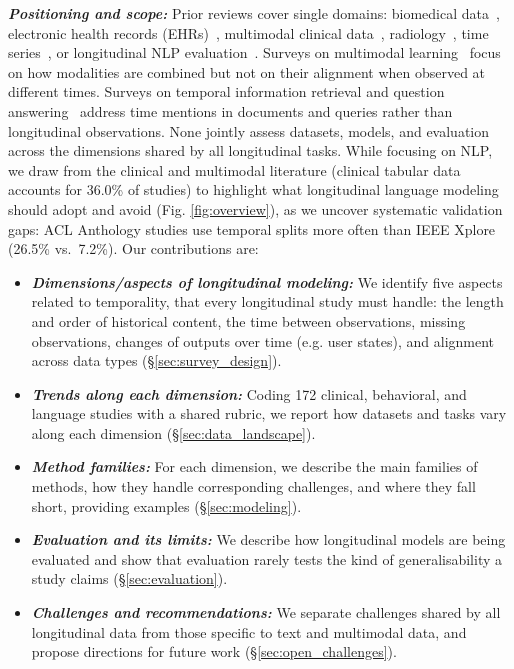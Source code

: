 \documentclass[11pt]{article}
\theoremstyle{plain}
\theoremstyle{definition}
\theoremstyle{remark}
\begin{document}
\noindent\emph{\textbf{Positioning and scope:}} Prior reviews cover single domains: biomedical data~\cite{cascarano2023machine}, electronic health records (EHRs)~\cite{xie2022deep,carrasco2023prediction}, multimodal clinical data~\cite{pan2026systematic}, radiology~\cite{zhou2025review}, time series~\cite{jin2026large}, or longitudinal NLP evaluation~\cite{ganesan2026word}. %
Surveys on multimodal learning~\cite{xu2024comprehensive} focus on how modalities are combined but not on their alignment when observed at different times. Surveys on temporal information retrieval and question answering~\cite{piryani2025itshightimesurvey} address time mentions in documents and queries rather than longitudinal observations. None jointly assess datasets, models, and evaluation across the dimensions shared by all longitudinal tasks. While focusing on NLP, we draw from the clinical and multimodal literature (clinical tabular data accounts for 36.0\% of studies) to highlight what longitudinal language modeling should adopt and avoid (Fig. \ref{fig:overview}), as we uncover systematic validation gaps: ACL Anthology studies use temporal splits more often than IEEE Xplore (26.5\% vs.\ 7.2\%). %
Our contributions are:
\begin{itemize}[leftmargin=*,nosep,labelsep=1em]
\item \emph{\textbf{Dimensions/aspects of longitudinal modeling:}} We identify five aspects related to temporality, that every longitudinal study must handle: the length and order of historical content, the time between observations, missing observations, changes of outputs over time (e.g. user states), and alignment across data types (\S\ref{sec:survey_design}).
\item \emph{\textbf{Trends along each dimension:}} Coding 172 clinical, behavioral, and language studies with a shared rubric, we report how datasets and tasks vary along each dimension (\S\ref{sec:data_landscape}).
\item \emph{\textbf{Method families:}} For each dimension, we describe the main families of methods, how they handle corresponding challenges, and where they fall short, providing examples (\S\ref{sec:modeling}).
\item \emph{\textbf{Evaluation and its limits:}} We describe how longitudinal models are being evaluated and show that evaluation rarely tests the kind of generalisability a study claims (\S\ref{sec:evaluation}).
\item \emph{\textbf{Challenges and recommendations:}} We separate challenges shared by all longitudinal data from those specific to text and multimodal data, and propose directions for future work (\S\ref{sec:open_challenges}).
\end{itemize}
\end{document}

